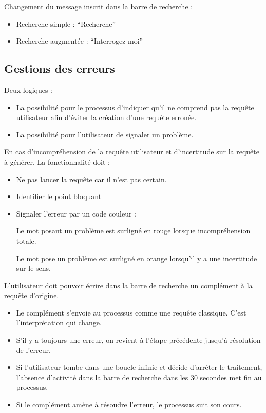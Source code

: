 Changement du message inscrit dans la barre de recherche :  

\begin{itemize}
	\item Recherche simple : “Recherche” 

	\item Recherche augmentée : “Interrogez-moi”
\end{itemize}  

\subsection{Gestions des erreurs}

Deux logiques : 

\begin{itemize}
	\item La possibilité pour le processus d’indiquer qu’il ne comprend pas la requête utilisateur afin d’éviter la création d’une requête erronée. 
	\item La possibilité pour l’utilisateur de signaler un problème. 

\end{itemize}

En cas d’incompréhension de la requête utilisateur et d’incertitude sur la requête à générer. La fonctionnalité doit :  

\begin{itemize}
	\item Ne pas lancer la requête car il n’est pas certain.  

	\item Identifier le point bloquant  

	\item Signaler l’erreur par un code couleur : 
	
	\subitem Le mot posant un problème est surligné en rouge lorsque incompréhension totale. 
	
	\subitem Le mot pose un problème est surligné en orange lorsqu’il y a une incertitude sur le sens. 
	
\end{itemize}


L’utilisateur doit pouvoir écrire dans la barre de recherche un complément à la requête d’origine. 

\begin{itemize}
	\item Le complément s’envoie au processus comme une requête classique. C’est l’interprétation qui change.  

	\item S'il y a toujours une erreur, on revient à l’étape précédente jusqu’à résolution de l’erreur.  

	\item Si l’utilisateur tombe dans une boucle infinie et décide d’arrêter le traitement, l’absence d’activité dans la barre de recherche dans les 30 secondes met fin au processus.  

	\item Si le complément amène à résoudre l’erreur, le processus suit son cours. 
\end{itemize}




